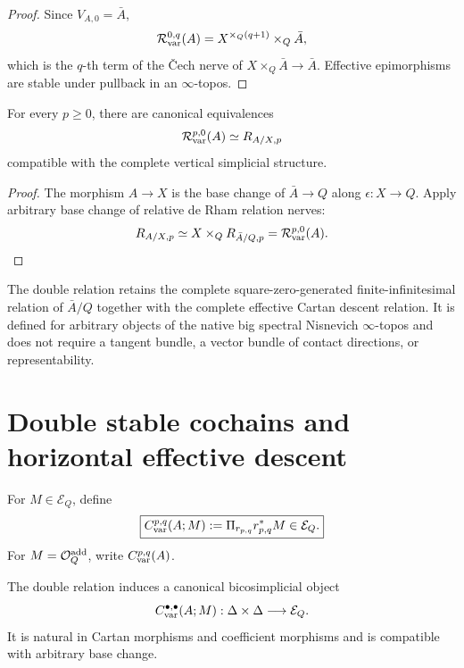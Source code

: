 \begin{proof}
Since \(V_{A,0}=\bar A\),
\[
    \mathcal R_{\mathrm{var}}^{0,q}(A)=X^{\times_Q(q+1)}\times_Q\bar A,
\]
which is the \(q\)-th term of the \v{C}ech nerve of \(X\times_Q\bar A\to\bar A\). Effective epimorphisms are stable under pullback in an \(\infty\)-topos.
\end{proof}

\begin{proposition}
\label{prop:var-vertical-boundary}
For every \(p\ge0\), there are canonical equivalences
\[
    \mathcal R_{\mathrm{var}}^{p,0}(A)
    \simeq
    R_{A/X,p}
\]
compatible with the complete vertical simplicial structure.
\end{proposition}

\begin{proof}
The morphism \(A\to X\) is the base change of \(\bar A\to Q\) along \(\epsilon:X\to Q\). Apply arbitrary base change of relative de Rham relation nerves:
\[
    R_{A/X,p}
    \simeq
    X\times_QR_{\bar A/Q,p}
    =
    \mathcal R_{\mathrm{var}}^{p,0}(A).
\]
\end{proof}

\begin{remark}
\label{rem:var-double-nonlinear}
The double relation retains the complete square-zero-generated finite-infinitesimal relation of \(\bar A/Q\) together with the complete effective Cartan descent relation. It is defined for arbitrary objects of the native big spectral Nisnevich \(\infty\)-topos and does not require a tangent bundle, a vector bundle of contact directions, or representability.
\end{remark}

\section{Double stable cochains and horizontal effective descent}
\label{sec:var-double-cochains}

\begin{definition}
\label{def:var-double-cochains}
For \(M\in\mathcal E_Q\), define
\[
    \boxed{
    C_{\mathrm{var}}^{p,q}(A;M)
    :=
    \Pi_{r_{p,q}}r_{p,q}^*M
    \in\mathcal E_Q.
    }
\]
For \(M=\mathcal O^{\mathrm{add}}_Q\), write \(C_{\mathrm{var}}^{p,q}(A)\).
\end{definition}

\begin{proposition}
\label{prop:var-bicosimplicial-cochains}
The double relation induces a canonical bicosimplicial object
\[
    C_{\mathrm{var}}^{\bullet,\bullet}(A;M):
    \Delta\times\Delta\longrightarrow\mathcal E_Q.
\]
It is natural in Cartan morphisms and coefficient morphisms and is compatible with arbitrary base change.
\end{proposition}

